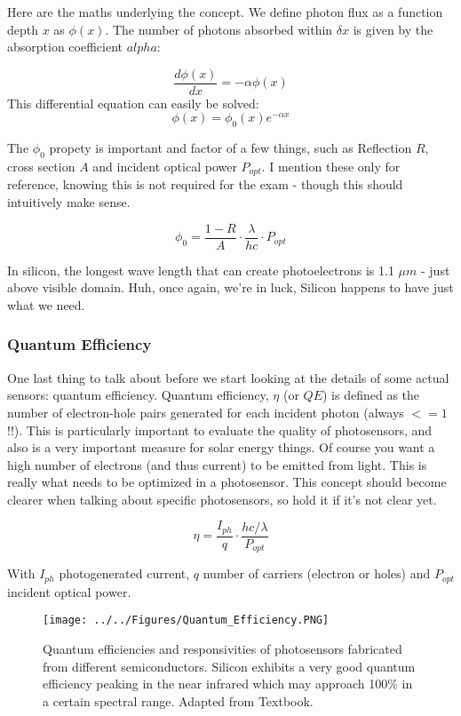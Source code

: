 Here are the maths underlying the concept. We define photon flux as a function depth $x$ as $\phi(x)$. 
The number of photons absorbed within $\delta x$ is given by the absorption coefficient $alpha$:

\begin{equation}
    \frac{d\phi(x)}{dx} = -\alpha \phi(x)
\end{equation}
This differential equation can easily be solved:
\begin{equation}
    \phi(x) =  \phi_0(x) e^{-\alpha x} 
\end{equation}

The $\phi_0$ propety is important and factor of a few things, such as Reflection $R$, cross section $A$ and incident optical power $P_{opt}$. I mention these only for reference, knowing this is not required for the exam - though this should intuitively make sense. 

\begin{equation}
    \phi_0 = \frac{1-R}{A}\cdot \frac{\lambda}{hc}\cdot P_{opt}
\end{equation}

In silicon, the longest wave length that can create photoelectrons is 1.1 $\mu m$ - just above visible domain. Huh, once again, we're in luck, Silicon happens to have just what we need. 


\subsubsection{Quantum Efficiency}

One last thing to talk about before we start looking at the details of some actual sensors: quantum efficiency. Quantum efficiency, $\eta$ (or $QE$) is defined as the number of electron-hole pairs generated for each incident photon (always $<=1$ !!). This is particularly important to evaluate the quality of photosensors, and also is a very important measure for solar energy things. Of course you want a high number of electrons (and thus current) to be emitted from light. This is really what needs to be optimized in a photosensor. This concept should become clearer when talking about specific photosensors, so hold it if it's not clear yet. 

\begin{equation}
    \eta = \frac{I_{ph}}{q}\cdot \frac{hc/\lambda}{P_{opt}}
\end{equation}

With $I_{ph}$ photogenerated current, $q$ number of carriers (electron or holes) and $P_{opt}$ incident optical power.

\begin{figure}[H]
    \centering
    \texttt{[image: ../../Figures/Quantum\_Efficiency.PNG]}
    \caption{Quantum efficiencies and responsivities of photosensors fabricated from different semiconductors. Silicon exhibits a very good quantum efficiency peaking in the near infrared which may approach 100\% in a certain spectral range. Adapted from Textbook.}
    \label{fig:Quantum_Efficiency}
\end{figure}




